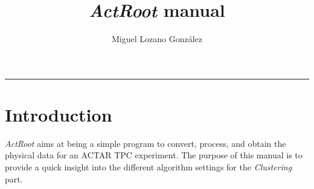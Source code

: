 \documentclass[11pt, a4paper, english]{article}
\title{\textbf{\textit{ActRoot} manual}}
\author{Miguel Lozano González\\
	}
\date{\empty}%
\begin{document}
\begin{minipage}{0.48\linewidth}
	\maketitle
\end{minipage}\hfill
\begin{minipage}{0.48\linewidth}
	\tableofcontents
\end{minipage}

\noindent\rule{\textwidth}{1pt}

\section{Introduction}
\textit{ActRoot} aims at being a simple program to convert, process, and obtain the physical data for an ACTAR TPC experiment. The purpose of this manual is to provide a quick insight into the different algorithm settings for the \textit{Clustering} part.
\end{document}
